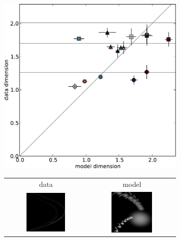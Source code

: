 \documentclass[10pt,a4paper,oneside]{article}
\theoremstyle{definition}
\begin{document}
\begin{figure}[t]
\centering

  \begin{subfigure}{0.66\textwidth}
	\includegraphics[width=\textwidth]{../img/dimension/out-table.pdf}
  \end{subfigure}
  \begin{subfigure}{0.33\textwidth}
    \begin{tabular}{c c }
    data & model \\
		\includegraphics[width=0.5\textwidth]{../img/dimension/data-henon.png} & 
		\includegraphics[width=0.5\textwidth]{../img/dimension/model-henon.png} \\

\end{tabular}
\end{subfigure}
\end{figure}
\end{document}
